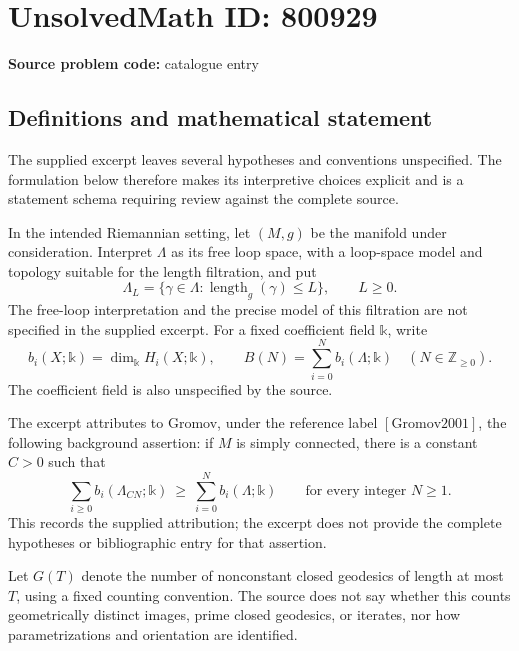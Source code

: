 \documentclass[11pt]{article}
\newcommand{\Z}{\mathbb{Z}}
\begin{document}
\section*{UnsolvedMath ID: 800929}
\textbf{Source problem code:} catalogue entry
\subsection{Definitions and mathematical statement}
The supplied excerpt leaves several hypotheses and conventions unspecified. The formulation below therefore makes its interpretive choices explicit and is a statement schema requiring review against the complete source.

In the intended Riemannian setting, let \((M,g)\) be the manifold under consideration. Interpret \(\Lambda\) as its free loop space, with a loop-space model and topology suitable for the length filtration, and put
\[
\Lambda_L=\{\gamma\in\Lambda:\operatorname{length}_g(\gamma)\leq L\},\qquad L\geq0.
\]
The free-loop interpretation and the precise model of this filtration are not specified in the supplied excerpt. For a fixed coefficient field \(\mathbb{k}\), write
\[
b_i(X;\mathbb{k})=\dim_{\mathbb{k}}H_i(X;\mathbb{k}),\qquad
B(N)=\sum_{i=0}^{N}b_i(\Lambda;\mathbb{k})
\quad(N\in\Z_{\geq0}).
\]
The coefficient field is also unspecified by the source.

The excerpt attributes to Gromov, under the reference label \([\mathrm{Gromov2001}]\), the following background assertion: if \(M\) is simply connected, there is a constant \(C>0\) such that
\[
\sum_{i\geq0}b_i(\Lambda_{CN};\mathbb{k})
\ \geq\ \sum_{i=0}^{N}b_i(\Lambda;\mathbb{k})
\qquad\text{for every integer }N\geq1.
\]
This records the supplied attribution; the excerpt does not provide the complete hypotheses or bibliographic entry for that assertion.

Let \(G(T)\) denote the number of nonconstant closed geodesics of length at most \(T\), using a fixed counting convention. The source does not say whether this counts geometrically distinct images, prime closed geodesics, or iterates, nor how parametrizations and orientation are identified.
\end{document}
